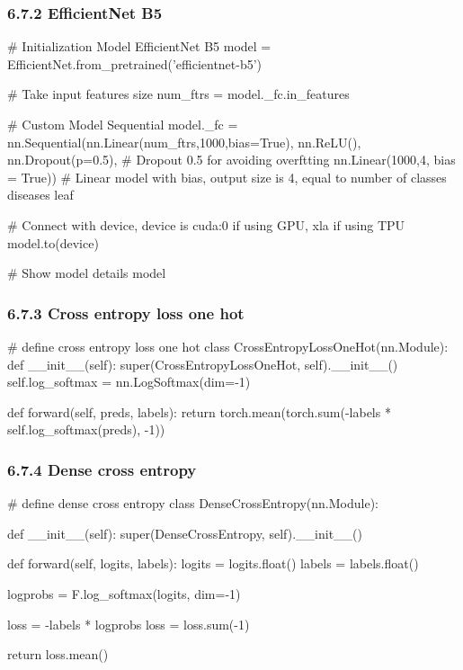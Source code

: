 \documentclass{article}
\begin{document}
	\subsubsection{6.7.2 EfficientNet B5}
	\begin{python}
		# Initialization Model EfficientNet B5
		model = EfficientNet.from_pretrained('efficientnet-b5') 
		
		# Take input features size
		num_ftrs = model._fc.in_features
		
		# Custom Model Sequential
		model._fc = nn.Sequential(nn.Linear(num_ftrs,1000,bias=True),
		nn.ReLU(),
		nn.Dropout(p=0.5), # Dropout 0.5 for avoiding overftting
		nn.Linear(1000,4, bias = True)) # Linear model with bias, output size is 4, equal to number of classes diseases leaf
		
		# Connect with device, device is cuda:0 if using GPU, xla if using TPU
		model.to(device)
		
		# Show model details
		model
	\end{python}
	\subsubsection{6.7.3 Cross entropy loss one hot}
	\begin{python}
		# define cross entropy loss one hot
		class CrossEntropyLossOneHot(nn.Module):
			def __init__(self):
				super(CrossEntropyLossOneHot, self).__init__()
				self.log_softmax = nn.LogSoftmax(dim=-1)
		
			def forward(self, preds, labels):
				return torch.mean(torch.sum(-labels * self.log_softmax(preds), -1))
	\end{python}
	\subsubsection{6.7.4 Dense cross entropy}
	\begin{python}
		# define dense cross entropy
		class DenseCrossEntropy(nn.Module):
		
			def __init__(self):
				super(DenseCrossEntropy, self).__init__()
		
		
			def forward(self, logits, labels):
				logits = logits.float()
				labels = labels.float()
		
				logprobs = F.log_softmax(logits, dim=-1)
		
				loss = -labels * logprobs
				loss = loss.sum(-1)
		
				return loss.mean()
	\end{python}
\end{document}
